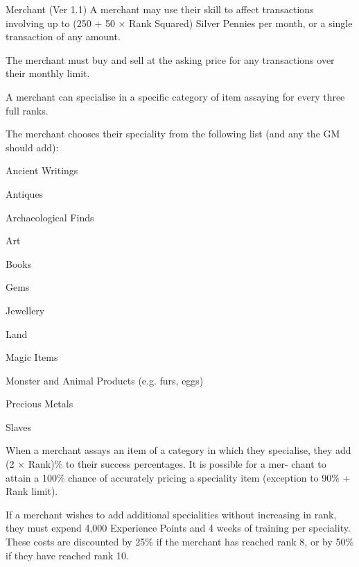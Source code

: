 \begin{Chapter}{Merchant (Ver 1.1)}
A merchant may use their skill to affect transactions involving up to
(250 + 50 × Rank Squared) Silver Pennies per month, or a single
transaction of any amount.

The merchant must buy and sell at the asking price for any
transactions over their monthly limit.

A merchant can specialise in a specific category of item assaying for
every three full ranks.

The merchant chooses their speciality from the following list (and any
the GM should add):

\begin{Enumerate}

\item Ancient Writings 
\item Antiques 
\item Archaeological Finds 
\item Art 
\item Books 
\item Gems 
\item Jewellery 
\item Land
\item Magic Items 
\item Monster and Animal Products (e.g. furs, eggs) 
\item Precious Metals 
\item Slaves 

\end{Enumerate}

When a merchant assays an item of a category in which they specialise,
they add (2 × Rank)\% to their success percentages.  It is possible
for a mer- chant to attain a 100\% chance of accurately pricing a
speciality item (exception to 90\% + Rank limit).

If a merchant wishes to add additional specialities without increasing
in rank, they must expend 4,000 Experience Points and 4 weeks of
training per speciality.  These costs are discounted by 25\% if the
merchant has reached rank 8, or by 50\% if they have reached rank 10.

\end{Chapter}
